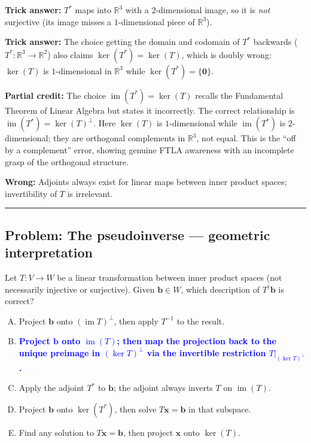 \documentclass[12pt]{amsart}
\newcommand{\divider}{
  \vspace{-1em}
  \noindent
  \raisebox{-0.15ex}{\textbullet}%
  \hspace{0.5em}%
  \rule[0.5ex]{0.95\textwidth}{1.0pt}%
  \hspace{0.5em}%
  \raisebox{-0.15ex}{\textbullet}%
  \vspace{0em}
}
\begin{document}
\textbf{Trick answer:}
$T^*$ maps into $\mathbb{R}^3$ with a $2$-dimensional image, so it is \emph{not}
surjective (its image misses a $1$-dimensional piece of $\mathbb{R}^3$).

\textbf{Trick answer:}
The choice getting the domain and codomain of $T^*$ backwards ($T^*: \mathbb{R}^3\to\mathbb{R}^2$)
also claims $\ker(T^*) = \ker(T)$, which is doubly wrong:
$\ker(T)$ is $1$-dimensional in $\mathbb{R}^3$ while $\ker(T^*) = \{\mathbf{0}\}$.

\textbf{Partial credit:}
The choice $\operatorname{im}(T^*) = \ker(T)$ recalls the Fundamental Theorem of
Linear Algebra but states it incorrectly.
The correct relationship is $\operatorname{im}(T^*) = \ker(T)^\perp$.
Here $\ker(T)$ is $1$-dimensional while $\operatorname{im}(T^*)$ is $2$-dimensional;
they are orthogonal complements in $\mathbb{R}^3$, not equal.
This is the ``off by a complement'' error, showing genuine FTLA awareness with
an incomplete grasp of the orthogonal structure.

\textbf{Wrong:}
Adjoints always exist for linear maps between inner product spaces;
invertibility of $T$ is irrelevant.

\divider

\subsection*{Problem: The pseudoinverse --- geometric interpretation}

Let $T: V \to W$ be a linear transformation between inner product spaces
(not necessarily injective or surjective).
Given $\mathbf{b} \in W$, which description of $T^\dagger \mathbf{b}$ is correct?

\begin{enumerate}[(A)]
\item Project $\mathbf{b}$ onto $(\operatorname{im} T)^\perp$, then apply $T^{-1}$ to the result.
\item \textcolor{blue}{\textbf{Project $\mathbf{b}$ onto $\operatorname{im}(T)$; then map the projection back to the unique preimage in $(\ker T)^\perp$ via the invertible restriction $T\big|_{(\ker T)^\perp}$.}}
\item Apply the adjoint $T^*$ to $\mathbf{b}$; the adjoint always inverts $T$ on $\operatorname{im}(T)$.
\item Project $\mathbf{b}$ onto $\ker(T^*)$, then solve $T\mathbf{x} = \mathbf{b}$ in that subspace.
\item Find any solution to $T\mathbf{x} = \mathbf{b}$, then project $\mathbf{x}$ onto $\ker(T)$.
\end{enumerate}
\end{document}
